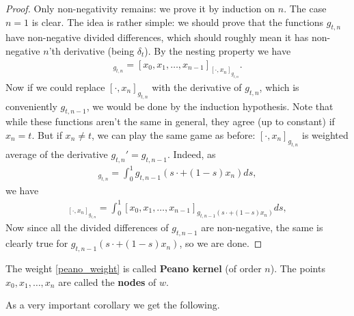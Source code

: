 \begin{proof}
	Only non-negativity remains: we prove it by induction on $n$. The case $n = 1$ is clear. The idea is rather simple: we should prove that the functions $g_{t, n}$ have non-negative divided differences, which should roughly mean it has non-negative $n$'th derivative (being $\delta_{t}$). By the nesting property we have
	\begin{align*}
		[x_{0}, x_{1}, \ldots, x_{n}]_{g_{t, n}} = [x_{0}, x_{1}, \ldots, x_{n - 1}]_{[\cdot, x_{n}]_{g_{t, n}}}.
	\end{align*}
	Now if we could replace $[\cdot, x_{n}]_{g_{t, n}}$ with the derivative of $g_{t, n}$, which is conveniently $g_{t, n - 1}$, we would be done by the induction hypothesis. Note that while these functions aren't the same in general, they agree (up to constant) if $x_{n} = t$. But if $x_{n} \neq t$, we can play the same game as before: $[\cdot, x_{n}]_{g_{t, n}}$ is weighted average of the derivative $g_{t, n}' = g_{t, n - 1}$. Indeed, as
	\begin{align*}
		[\cdot, x_{n}]_{g_{t, n}} = \int_{0}^{1} g_{t, n - 1}(s \cdot + (1 - s) x_{n}) ds,
	\end{align*}
	we have
	\begin{align*}
		[x_{0}, x_{1}, \ldots, x_{n - 1}]_{[\cdot, x_{n}]_{g_{t, n}}} = \int_{0}^{1} [x_{0}, x_{1}, \ldots, x_{n - 1}]_{g_{t, n - 1}(s \cdot + (1 - s) x_{n})} ds,
	\end{align*}
	Now since all the divided differences of $g_{t, n - 1}$ are non-negative, the same is clearly true for $g_{t, n - 1}(s \cdot + (1 - s) x_{n})$, so we are done.
\end{proof}

The weight \ref{peano_weight} is called \textbf{Peano kernel} (of order $n$). The points $x_{0}, x_{1}, \ldots, x_{n}$ are called the \textbf{nodes} of $w$.

As a very important corollary we get the following.

